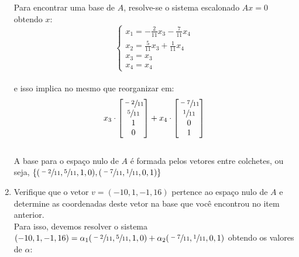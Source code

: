 \begin{enumerate}
          Para encontrar uma base de $A$, resolve-se o sistema escalonado $A x = 0$ obtendo $x$:
          \\

          \[
              \begin{cases}
                  x_1=-\frac{2}{11}x_3-\frac{7}{11}x_4  \\
                  x_2 = \frac{5}{11}x_3+\frac{1}{11}x_4 \\
                  x_3 = x_3                             \\
                  x_4 = x_4
              \end{cases}
          \]
          \\

          e isso implica no mesmo que reorganizar em:
          \\

          \[
              x_3 \cdot
              \begin{bmatrix}
                  \sfrac{-2}{11} \\
                  \sfrac{5}{11}  \\
                  1              \\
                  0
              \end{bmatrix} +
              x_4 \cdot
              \begin{bmatrix}
                  \sfrac{-7}{11} \\
                  \sfrac{1}{11}  \\
                  0              \\
                  1
              \end{bmatrix}
          \]
          \\

          A base para o espaço nulo de $A$ é formada pelos vetores entre colchetes, ou seja, $\{(\sfrac{-2}{11}, \sfrac{5}{11},1,0),(\sfrac{-7}{11},\sfrac{1}{11},0,1)\}$\\

    \item Verifique que o vetor $v = (-10, 1, -1, 16)$ pertence ao espaço nulo de $A$ e determine as coordenadas deste vetor na base que você encontrou no item anterior.
          \\

          Para isso, devemos resolver o sistema $(-10, 1, -1, 16) =\alpha_1(\sfrac{-2}{11}, \sfrac{5}{11},1,0)+\alpha_2(\sfrac{-7}{11},\sfrac{1}{11},0,1) $ obtendo os valores de $\alpha$:
          \\


\end{enumerate}
